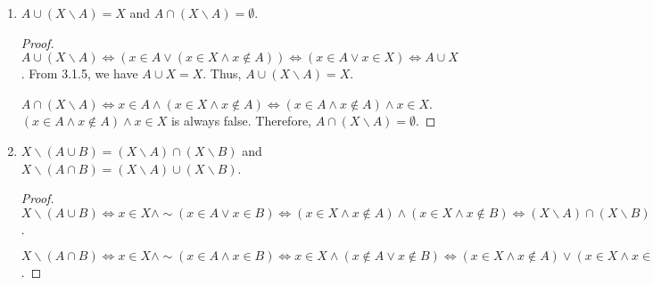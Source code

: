 \documentclass[12pt, letter]{article}
\begin{document}
\begin{enumerate}
\begin{proof}
        $x\in A\lor(x\in B\land x\in C)\iff(x\in A\lor x\in B)\land(x\in A\lor x\in C)$, $A\cap(B\cup C)=(A\cap B)\cup(A\cap C)$ and $A\cup(B\cap C)=(A\cup B)\cap(A\cup C)$
        are also true.
    \end{proof}
    \item $A\cup(X\backslash A)=X$ and $A\cap(X\backslash A)=\emptyset$.
    \begin{proof}
        $A\cup(X\backslash A)\iff (x\in A\lor(x\in X\land x\notin A))\iff(x\in A\lor x\in X)\iff A\cup X$.
        From 3.1.5, we have $A\cup X=X$. Thus, $A\cup(X\backslash A)=X$.

        $A\cap(X\backslash A)\iff x\in A\land(x\in X\land x\notin A)\iff (x\in A\land x\notin A)\land x\in X$. $(x\in A\land x\notin A)\land x\in X$ is always false. Therefore, 
        $A\cap(X\backslash A)=\emptyset$.
    \end{proof}
    \item $X\backslash(A\cup B)=(X\backslash A)\cap(X\backslash B)$ and $X\backslash(A\cap B)=(X\backslash A)\cup(X\backslash B)$.
    \begin{proof}
        $X\backslash(A\cup B)\iff x\in X\land\sim(x\in A\lor x\in B)\iff (x\in X\land x\notin A)\land (x\in X\land x\notin B)\iff (X\backslash A)\cap(X\backslash B)$.

        $X\backslash (A\cap B)\iff x\in X\land\sim(x\in A\land x\in B)\iff x\in X\land(x\notin A\lor x\notin B)\iff(x\in X\land x\notin A)\lor(x\in X\land x\in B)\iff (X\backslash A)\cup(X\backslash B)$.
    \end{proof}
\end{enumerate}
\end{document}
